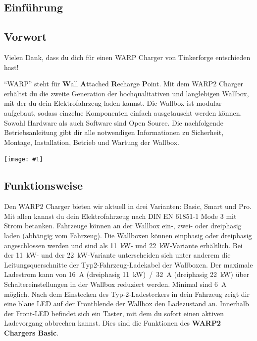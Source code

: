 \documentclass[a4paper,10pt]{article}
\newcommand{\gfx}[1]{\texttt{[image: \#1]}}
\begin{document}
\begin{multicols*}{2}
	\tableofcontents \section{Einführung}
	\subsection{Vorwort} Vielen Dank, dass du
	dich für einen WARP Charger von Tinkerforge entschieden hast!

	\enquote{WARP} steht
	für \textbf{W}all \textbf{A}ttached
	\textbf{R}echarge \textbf{P}oint. Mit dem WARP2 Charger
	erhältst du die zweite Generation der hochqualitativen und langlebigen Wallbox, 
	mit der du dein Elektrofahrzeug laden kannst. 
	Die Wallbox ist modular aufgebaut, sodass
	einzelne Komponenten einfach ausgetauscht werden können. Sowohl Hardware als
	auch Software sind Open Source. Die nachfolgende Betriebsanleitung gibt dir
	alle notwendigen Informationen zu Sicherheit, Montage, Installation, Betrieb
	und Wartung der Wallbox.

	\vfill
	\gfx{./img_warp2/resized/type_2_connector_ready}

	\subsection{Funktionsweise}
	Den WARP2 Charger bieten wir aktuell in drei Varianten: Basic, Smart und Pro.
	Mit allen kannst du dein Elektrofahrzeug nach DIN EN 61851‐1 Mode 3 mit Strom
	betanken. Fahrzeuge können an der Wallbox ein-, zwei- oder dreiphasig laden
	(abhängig vom Fahrzeug). Die Wallboxen können einphasig oder dreiphasig
	angeschlossen werden und sind als \SI{11}{\kilo\watt}- und
	\SI{22}{\kilo\watt}-Variante erhältlich. Bei der \SI{11}{\kilo\watt}- und
	der \SI{22}{\kilo\watt}-Variante unterscheiden sich unter anderem die
	Leitungsquerschnitte der Typ2-Fahrzeug-Ladekabel der Wallboxen. Der maximale Ladestrom
	kann von \SI{16}{\ampere}
	(dreiphasig \SI{11}{\kilo\watt})~/~\SI{32}{\ampere} (dreiphasig \SI{22}{\kilo\watt}) über
	Schaltereinstellungen in der Wallbox reduziert werden. Minimal sind
	\SI{6}{\ampere} möglich. Nach dem Einstecken des Typ-2-Ladesteckers in
	dein Fahrzeug zeigt dir eine blaue LED auf der Frontblende der Wallbox den
	Ladezustand an. Innerhalb der Front-LED befindet sich ein Taster, mit dem
	du sofort einen aktiven Ladevorgang abbrechen kannst. Dies sind die
	Funktionen des \textbf{WARP2 Chargers Basic}.


\end{multicols*}
\end{document}
